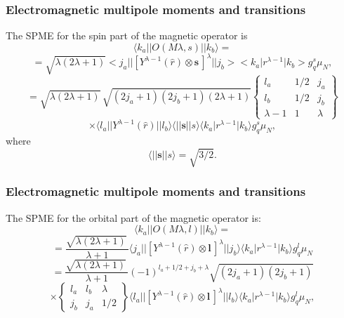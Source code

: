 \documentclass{beamer}
\begin{document}
\begin{frame}
\frametitle{Electromagnetic multipole moments and transitions}

\begin{block}{}
The SPME for the spin part of the magnetic operator is
\[
\langle k_{a}\vert\vert O(M\lambda ,s)\vert\vert k_{b}\rangle =
\]
\[
=\sqrt{\lambda (2\lambda +1)}<j_{a}\vert\vert [Y^{\lambda -1}(\hat{r})\otimes\mathbf{s}\,]^{\lambda }\vert\vert j_{b}><k_{a}\vert r^{\lambda -1}\vert k_{b}>g^{s}_{q}\mu _{N},
\]
\[
= \sqrt{\lambda (2\lambda +1)}\, \sqrt{(2j_{a}+1)(2j_{b}+1)(2\lambda +1)}\left\{\begin{array}{ccc}  {l _{a}}&  {1/2} & {j_{a}}\\  {l _{b}}&  {1/2} & {j_{b}}\\  {\lambda -1} & {1} & {\lambda}\end{array}\right\}
\]
\[
\times \langle l _{a}\vert\vert Y^{\lambda -1}(\hat{r})\vert\vert l _{b}\rangle\langle\vert\vert \mathbf{s}\vert\vert s\rangle\langle k_{a}\vert r^{\lambda -1}\vert k_{b}\rangle g^{s}_{q}\mu _{N},
\]
where
\[
\langle\vert\vert \mathbf{s}\vert\vert s\rangle = \sqrt{3/2}.
\]
\end{block}
\end{frame}

\begin{frame}
\frametitle{Electromagnetic multipole moments and transitions}

\begin{block}{}
The SPME for the orbital part of the magnetic operator is:
\[
\langle k_{a}\vert\vert O(M\lambda ,l )\vert\vert k_{b}\rangle=
\]
\[
= \frac{\sqrt{\lambda (2\lambda +1)}\, }{\lambda +1}
\langle j_{a}\vert\vert [Y^{\lambda -1}(\hat{r})\otimes\mathbf{l}\,]^{\lambda }\vert\vert j_{b}\rangle
\langle k_{a}\vert r^{\lambda -1}\vert k_{b}\rangle g^{l }_{q}\mu _{N}
\]
\[
=\frac{\sqrt{\lambda (2\lambda +1)}\, }{\lambda +1}(-1)^{l _{a}+1/2+j_{b}+\lambda } \sqrt{(2j_{a}+1)(2j_{b}+1)}
\]
\[
\times\left\{\begin{array}{ccc}  {l _{a}} &  {l _{b}} & {\lambda} \\  {j_{b}}&  {j_{a}}&  {1/2}\end{array}\right\}
\langle l _{a}\vert\vert [Y^{\lambda -1}(\hat{r})\otimes\mathbf{l}\,]^{\lambda }\vert\vert l _{b}\rangle
\langle k_{a}\vert r^{\lambda -1}\vert k_{b}\rangle g^{l }_{q}\mu _{N}, 
\]
\end{block}
\end{frame}
\end{document}
